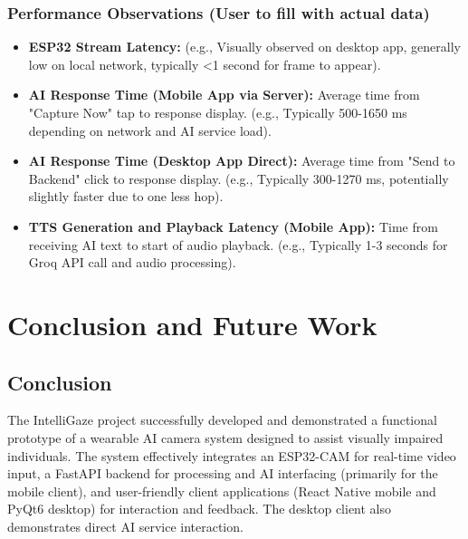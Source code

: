 \documentclass[12pt, a4paper]{report}
\begin{document}
\subsection{Performance Observations (User to fill with actual data)}
\begin{itemize}
    \item \textbf{ESP32 Stream Latency:} (e.g., Visually observed on desktop app, generally low on local network, typically <1 second for frame to appear).
    \item \textbf{AI Response Time (Mobile App via Server):} Average time from "Capture Now" tap to response display. (e.g., Typically 500-1650 ms depending on network and AI service load).
    \item \textbf{AI Response Time (Desktop App Direct):} Average time from "Send to Backend" click to response display. (e.g., Typically 300-1270 ms, potentially slightly faster due to one less hop).
    \item \textbf{TTS Generation and Playback Latency (Mobile App):} Time from receiving AI text to start of audio playback. (e.g., Typically 1-3 seconds for Groq API call and audio processing).
\end{itemize}

\chapter{Conclusion and Future Work}
\section{Conclusion}
The IntelliGaze project successfully developed and demonstrated a functional prototype of a wearable AI camera system designed to assist visually impaired individuals. The system effectively integrates an ESP32-CAM for real-time video input, a FastAPI backend for processing and AI interfacing (primarily for the mobile client), and user-friendly client applications (React Native mobile and PyQt6 desktop) for interaction and feedback. The desktop client also demonstrates direct AI service interaction.
\end{document}
